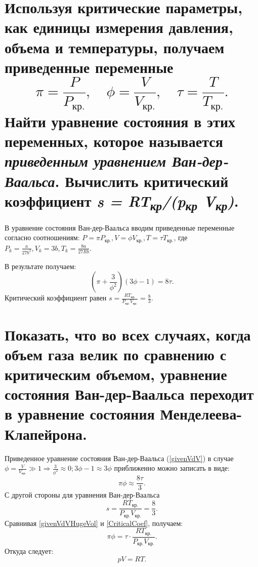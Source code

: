 \section{Используя критические параметры, как единицы измерения
давления, объема и температуры, получаем приведенные переменные
\begin{equation*}
  \pi = \frac{P}{P_\text{кр.}}, \quad \phi = \frac{V}{V_\text{кр.}}, \quad \tau = \frac{T}{T_\text{кр.}}.
\end{equation*}
Найти уравнение состояния в этих переменных, которое называется
\emph{приведенным уравнением Ван-дер-Ваальса}. Вычислить критический
коэффициент \emph{s = RT\textsubscript{кр}/(p\textsubscript{кр}
V\textsubscript{кр})}.}

\solving{}

В уравнение состояния Ван-дер-Ваальса вводим приведенные переменные
согласно соотношениям: $P = \pi P_\text{кр.}, V = \phi V_\text{кр.}, T = \tau T_\text{кр.}$,
где $P_k = \frac{a}{27b^2}, V_k = 3b, T_k = \frac{8a}{27Rb}$.

В результате получаем:
\begin{equation} \label{givenVdV}
  \left (\pi + \frac{3}{\phi^2} \right )(3\phi -1) = 8\tau.
\end{equation}
Критический коэффициент равен $s = \frac{RT_\text{кр.}}{P_\text{кр.}V_\text{кр.}} = \frac{8}{3}$.

\section{Показать, что во всех случаях, когда объем газа велик по
сравнению с критическим объемом, уравнение состояния Ван-дер-Ваальса
переходит в уравнение состояния Менделеева-Клапейрона.}

\solving{}

Приведенное уравнение состояния Ван-дер-Ваальса (\ref{givenVdV})
в случае $\phi = \frac{V}{V_\text{кр.}} \gg 1 \Rightarrow \frac{3}{\phi^2} \approx 0; 3\phi -1 \approx 3\phi$ приближенно можно записать в виде:
\begin{equation} \label{givenVdVHugeVol}
  \pi\phi\approx \frac{8\tau}{3}.
\end{equation}
С другой стороны для уравнения Ван-дер-Ваальса
\begin{equation} \label{CriticalCoef}
  s = \frac{RT_\text{кр.}}{P_\text{кр.}V_\text{кр.}} = \frac{8}{3}.
\end{equation}
Сравнивая \ref{givenVdVHugeVol} и \ref{CriticalCoef}, получаем: 
\begin{equation} 
  \pi\phi = \tau\cdot\frac{RT_\text{кр.}}{P_\text{кр.}V_\text{кр.}}.
\end{equation}
Откуда следует: 
\begin{equation}
  pV = RT.
\end{equation}

